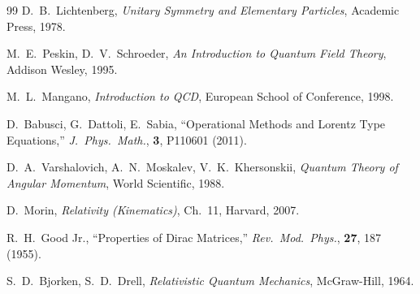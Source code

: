 \begin{thebibliography}{99}
D.~B.~Lichtenberg, \emph{Unitary Symmetry and Elementary Particles}, Academic Press, 1978.

M.~E.~Peskin, D.~V.~Schroeder, \emph{An Introduction to Quantum Field Theory}, Addison Wesley, 1995.

M.~L.~Mangano, \emph{Introduction to QCD}, European School of Conference, 1998.

D.~Babusci, G.~Dattoli, E.~Sabia,
``Operational Methods and Lorentz Type Equations,''
\emph{J.\ Phys.\ Math.}, \textbf{3}, P110601 (2011).

D.~A.~Varshalovich, A.~N.~Moskalev, V.~K.~Khersonskii,
\emph{Quantum Theory of Angular Momentum}, World Scientific, 1988.

D.~Morin, \emph{Relativity (Kinematics)}, Ch.~11, Harvard, 2007.

R.~H.~Good Jr.,
``Properties of Dirac Matrices,''
\emph{Rev.\ Mod.\ Phys.}, \textbf{27}, 187 (1955).

S.~D.~Bjorken, S.~D.~Drell, \emph{Relativistic Quantum Mechanics}, McGraw-Hill, 1964.

\end{thebibliography}
